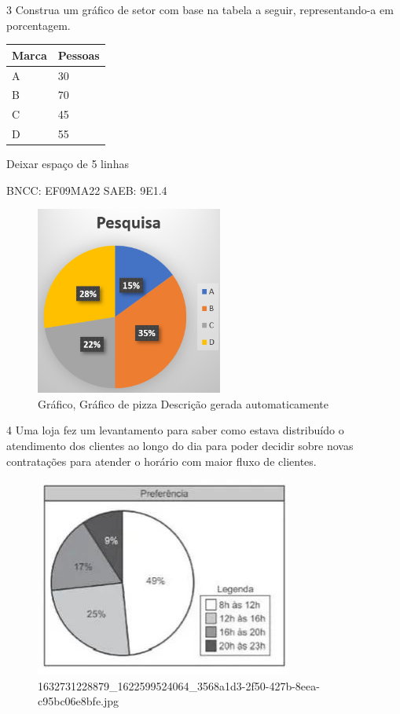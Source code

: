 \begin{escolha}
{{{\begin{escolha}
{{{{{\begin{escolha}
\begin{escolha}
{\begin{q°}
\num{3} Construa um gráfico de setor com base na tabela a seguir,
representando-a em porcentagem.

\begin{longtable}[]{@{}ll@{}}
\toprule\noalign{}
\textbf{Marca} & \textbf{Pessoas} \\
\midrule\noalign{}
\endhead
\bottomrule\noalign{}
\endlastfoot
A & 30 \\
B & 70 \\
C & 45 \\
D & 55 \\
\end{longtable}

Deixar espaço de 5 linhas

BNCC: EF09MA22 SAEB: 9E1.4

\begin{figure}
\centering
\includegraphics[width=2.41667in,height=2.43637in]{./_SAEB_9_MAT/media/image213.png}
\caption{Gráfico, Gráfico de pizza Descrição gerada automaticamente}
\end{figure}

\num{4} Uma loja fez um levantamento para saber como estava distribuído o
atendimento dos clientes ao longo do dia para poder decidir sobre novas
contratações para atender o horário com maior fluxo de clientes.

\begin{figure}
\centering
\includegraphics[width=3.32598in,height=2.58268in]{./_SAEB_9_MAT/media/image214.jpg}
\caption{1632731228879\_1622599524064\_3568a1d3-2f50-427b-8eea-c95bc06e8bfe.jpg}
\end{figure}


\end{q°}}
\end{escolha}
\end{escolha}}}}}}
\end{escolha}}}}
\end{escolha}
